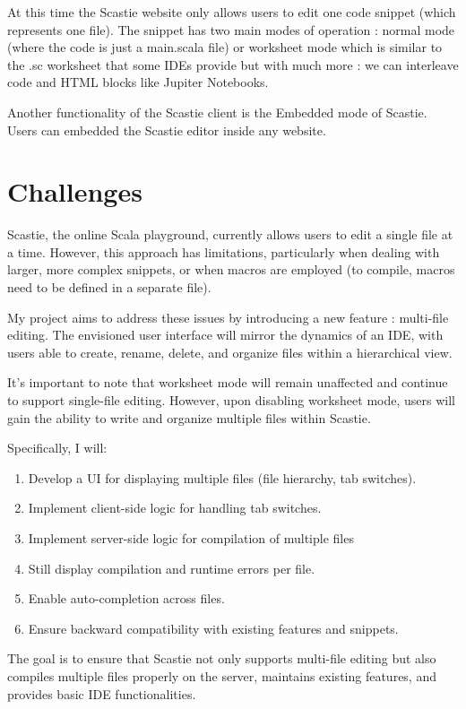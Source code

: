 \documentclass[a4paper,11pt,oneside]{report}
\begin{document}
At this time the Scastie website only allows users to edit one code snippet (which represents one file). The snippet has two main modes of operation : normal mode (where the code is just a main.scala file) or worksheet mode which is similar to the .sc worksheet that some IDEs provide but with much more : we can interleave code and HTML blocks like Jupiter Notebooks.

Another functionality of the Scastie client is the Embedded mode of Scastie. Users can embedded the Scastie editor inside any website.

\section{Challenges}
Scastie, the online Scala playground, currently allows users to edit a single file at a time. However, this approach has limitations, particularly when dealing with larger, more complex snippets, or when macros are employed (to compile, macros need to be defined in a separate file).

My project aims to address these issues by introducing a new feature : multi-file editing. The envisioned user interface will mirror the dynamics of an IDE, with users able to create, rename, delete, and organize files within a hierarchical view.

It's important to note that worksheet mode will remain unaffected and continue to support single-file editing. However, upon disabling worksheet mode, users will gain the ability to write and organize multiple files within Scastie.

Specifically, I will:
\begin{enumerate}
\item Develop a UI for displaying multiple files (file hierarchy, tab switches).
\item Implement client-side logic for handling tab switches.
\item Implement server-side logic for compilation of multiple files
\item Still display compilation and runtime errors per file.
\item Enable auto-completion across files.
\item Ensure backward compatibility with existing features and snippets.
\end{enumerate}

The goal is to ensure that Scastie not only supports multi-file editing but also compiles multiple files properly on the server, maintains existing features, and provides basic IDE functionalities. 
\end{document}
